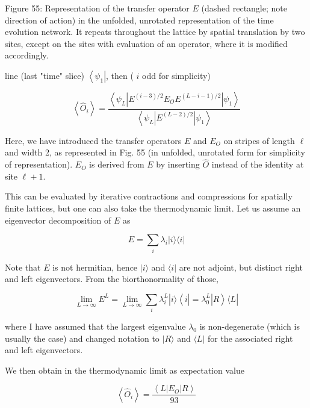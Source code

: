 \documentclass[12pt]{article}
\begin{document}
Figure 55: Representation of the transfer operator $E$ (dashed rectangle; note direction of action) in the unfolded, unrotated representation of the time evolution network. It repeats throughout the lattice by spatial translation by two sites, except on the sites with evaluation of an operator, where it is modified accordingly.

line (last "time" slice) $\left\langle\psi_{1}\right|$, then ( $i$ odd for simplicity)


\begin{equation*}
\left\langle\hat{O}_{i}\right\rangle=\frac{\left\langle\psi_{L}\left|E^{(i-3) / 2} E_{O} E^{(L-i-1) / 2}\right| \psi_{1}\right\rangle}{\left\langle\psi_{L}\left|E^{(L-2) / 2}\right| \psi_{1}\right\rangle} \tag{287}
\end{equation*}


Here, we have introduced the transfer operators $E$ and $E_{O}$ on stripes of length $\ell$ and width 2, as represented in Fig. 55 (in unfolded, unrotated form for simplicity of representation). $E_{O}$ is derived from $E$ by inserting $\hat{O}$ instead of the identity at site $\ell+1$.

This can be evaluated by iterative contractions and compressions for spatially finite lattices, but one can also take the thermodynamic limit. Let us assume an eigenvector decomposition of $E$ as


\begin{equation*}
E=\sum_{i} \lambda_{i}|i\rangle\langle i| \tag{288}
\end{equation*}


Note that $E$ is not hermitian, hence $|i\rangle$ and $\langle i|$ are not adjoint, but distinct right and left eigenvectors. From the biorthonormality of those,


\begin{equation*}
\lim _{L \rightarrow \infty} E^{L}=\lim _{L \rightarrow \infty} \sum_{i} \lambda_{i}^{L}|i\rangle\left\langle i\left|=\lambda_{0}^{L}\right| R\right\rangle\langle L| \tag{289}
\end{equation*}


where I have assumed that the largest eigenvalue $\lambda_{0}$ is non-degenerate (which is usually the case) and changed notation to $|R\rangle$ and $\langle L|$ for the associated right and left eigenvectors.

We then obtain in the thermodynamic limit as expectation value


\begin{equation*}
\left\langle\hat{O}_{i}\right\rangle=\frac{\left\langle L\left|E_{O}\right| R\right\rangle}{93} \tag{290}
\end{equation*}
\end{document}
